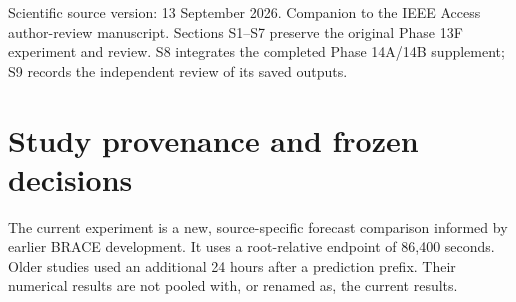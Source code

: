 Scientific source version: 13 September 2026. Companion to the IEEE Access author-review manuscript. Sections S1--S7 preserve the original Phase 13F experiment and review. S8 integrates the completed Phase 14A/14B supplement; S9 records the independent review of its saved outputs.

\hypertarget{study-provenance-and-frozen-decisions}{%
\section{Study provenance and frozen decisions}\label{study-provenance-and-frozen-decisions}}

The current experiment is a new, source-specific forecast comparison informed by earlier BRACE development. It uses a root-relative endpoint of 86,400 seconds. Older studies used an additional 24 hours after a prediction prefix. Their numerical results are not pooled with, or renamed as, the current results.

